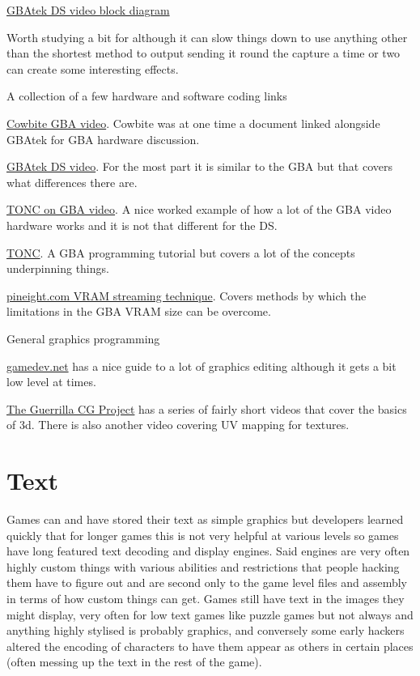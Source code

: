 \documentclass[
]{book}
\begin{document}
\href{http://problemkaputt.de/gbatek.htm\#dsvideodisplaysystemblockdiagram}{GBAtek DS video block diagram}

Worth studying a bit for although it can slow things down to use anything other than the shortest method to output sending it round the capture a time or two can create some interesting effects.

A collection of a few hardware and software coding links

\href{http://www.cs.rit.edu/~tjh8300/CowBite/CowBiteSpec.htm\#Graphics\%20Hardware\%20Overview}{Cowbite GBA video}. Cowbite was at one time a document linked alongside GBAtek for GBA hardware discussion.

\href{http://problemkaputt.de/gbatek.htm\#dsvideo}{GBAtek DS video}. For the most part it is similar to the GBA but that covers what differences there are.

\href{http://www.coranac.com/tonc/text/video.htm}{TONC on GBA video}. A nice worked example of how a lot of the GBA video hardware works and it is not that different for the DS.

\href{http://www.coranac.com/tonc/text/toc.htm}{TONC}. A GBA programming tutorial but covers a lot of the concepts underpinning things.

\href{http://pineight.com/gba/managing-sprite-vram.txt}{pineight.com VRAM streaming technique}. Covers methods by which the limitations in the GBA VRAM size can be overcome.

General graphics programming

\href{http://www.gamedev.net/page/resources/_/technical/graphics-programming-and-theory/graphics-programming-black-book-r1698}{gamedev.net} has a nice guide to a lot of graphics editing although it gets a bit low level at times.

\href{http://www.youtube.com/playlist?list=PL6A7DF3D7866EB076\&feature=plpp}{The Guerrilla CG Project} has a series of fairly short videos that cover the basics of 3d. There is also another video covering UV mapping for textures.

\hypertarget{text}{%
\chapter{Text}\label{text}}

Games can and have stored their text as simple graphics but developers learned quickly that for longer games this is not very helpful at various levels so games have long featured text decoding and display engines. Said engines are very often highly custom things with various abilities and restrictions that people hacking them have to figure out and are second only to the game level files and assembly in terms of how custom things can get. Games still have text in the images they might display, very often for low text games like puzzle games but not always and anything highly stylised is probably graphics, and conversely some early hackers altered the encoding of characters to have them appear as others in certain places (often messing up the text in the rest of the game).
\end{document}
